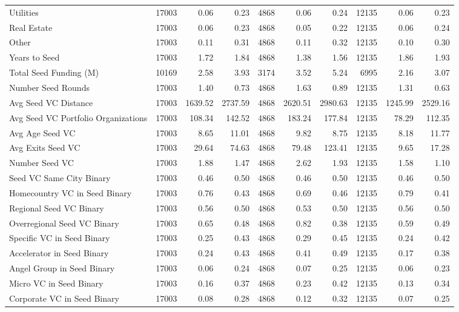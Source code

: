 {\begin{table}[!h]
{\begin{tabular}[t]{lrrrrrrrrr}
Utilities & 17003 & 0.06 & 0.23 & 4868 & 0.06 & 0.24 & 12135 & 0.06 & 0.23\\
Real Estate & 17003 & 0.06 & 0.23 & 4868 & 0.05 & 0.22 & 12135 & 0.06 & 0.24\\
Other & 17003 & 0.11 & 0.31 & 4868 & 0.11 & 0.32 & 12135 & 0.10 & 0.30\\
Years to Seed & 17003 & 1.72 & 1.84 & 4868 & 1.38 & 1.56 & 12135 & 1.86 & 1.93\\
\addlinespace
Total Seed Funding (M) & 10169 & 2.58 & 3.93 & 3174 & 3.52 & 5.24 & 6995 & 2.16 & 3.07\\
Number Seed Rounds & 17003 & 1.40 & 0.73 & 4868 & 1.63 & 0.89 & 12135 & 1.31 & 0.63\\
Avg Seed VC Distance & 17003 & 1639.52 & 2737.59 & 4868 & 2620.51 & 2980.63 & 12135 & 1245.99 & 2529.16\\
Avg Seed VC Portfolio Organizations & 17003 & 108.34 & 142.52 & 4868 & 183.24 & 177.84 & 12135 & 78.29 & 112.35\\
Avg Age Seed VC & 17003 & 8.65 & 11.01 & 4868 & 9.82 & 8.75 & 12135 & 8.18 & 11.77\\
\addlinespace
Avg Exits Seed VC & 17003 & 29.64 & 74.63 & 4868 & 79.48 & 123.41 & 12135 & 9.65 & 17.28\\
Number Seed VC & 17003 & 1.88 & 1.47 & 4868 & 2.62 & 1.93 & 12135 & 1.58 & 1.10\\
Seed VC Same City Binary & 17003 & 0.46 & 0.50 & 4868 & 0.46 & 0.50 & 12135 & 0.46 & 0.50\\
Homecountry VC in Seed Binary & 17003 & 0.76 & 0.43 & 4868 & 0.69 & 0.46 & 12135 & 0.79 & 0.41\\
Regional Seed VC Binary & 17003 & 0.56 & 0.50 & 4868 & 0.53 & 0.50 & 12135 & 0.56 & 0.50\\
\addlinespace
Overregional Seed VC Binary & 17003 & 0.65 & 0.48 & 4868 & 0.82 & 0.38 & 12135 & 0.59 & 0.49\\
Specific VC in Seed Binary & 17003 & 0.25 & 0.43 & 4868 & 0.29 & 0.45 & 12135 & 0.24 & 0.42\\
Accelerator in Seed Binary & 17003 & 0.24 & 0.43 & 4868 & 0.41 & 0.49 & 12135 & 0.17 & 0.38\\
Angel Group in Seed Binary & 17003 & 0.06 & 0.24 & 4868 & 0.07 & 0.25 & 12135 & 0.06 & 0.23\\
Micro VC in Seed Binary & 17003 & 0.16 & 0.37 & 4868 & 0.23 & 0.42 & 12135 & 0.13 & 0.34\\
\addlinespace
Corporate VC in Seed Binary & 17003 & 0.08 & 0.28 & 4868 & 0.12 & 0.32 & 12135 & 0.07 & 0.25\\

\end{tabular}}
\end{table}}
